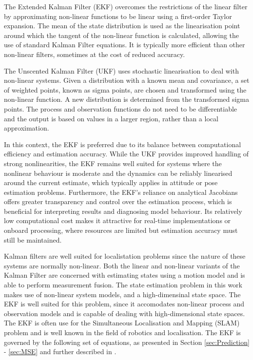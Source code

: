 \noindent
The Extended Kalman Filter (EKF) overcomes the restrictions of the linear filter by approximating non-linear functions to be linear using a first-order Taylor expansion.
The mean of the state distribution is used as the linearisation point around which the tangent of the non-linear function is calculated, allowing the use of standard
Kalman Filter equations. It is typically more efficient than other non-linear filters, sometimes at the cost of reduced accuracy.
\vspace{0.5cm}

\noindent
The Unscented Kalman Filter (UKF) uses stochastic linearisation to deal with non-linear systems. Given a distribution with a known mean and covariance, a set of weighted points,
known as sigma points, are chosen and transformed using the non-linear function. A new distribution is determined from the transformed sigma points. The process and observation
functions do not need to be differentiable and the output is based on values in a larger region, rather than a local approximation.
\vspace{0.5cm}

\noindent
In this context, the EKF is preferred due to its balance between computational efficiency and estimation accuracy. While the UKF provides improved handling of strong nonlinearities, the EKF remains well suited for systems where the nonlinear behaviour is moderate and the dynamics can be reliably linearised around the current estimate, which typically applies in attitude or pose estimation problems. Furthermore, the EKF's reliance on analytical Jacobians offers greater transparency and control over the estimation process, which is beneficial for interpreting results and diagnosing model behaviour. Its relatively low computational cost makes it attractive for real-time implementations or onboard processing, where resources are limited but estimation accuracy must still be maintained.


Kalman filters are well suited for localistation problems since the nature of these systems are normally non-linear. Both the linear and non-linear variants of the Kalman Filter
are concerned with estimating states using a motion model and is able to perform measurement fusion. The state estimation problem in this work makes use of non-linear system 
models, and a high-dimensinal state space. The EKF is well suited for this problem, since it accomodates non-linear process and observation models and is capable 
of dealing with high-dimensional state spaces. The EKF is often use for the Simultaneous Localisation and Mapping (SLAM) problem and is well known in the field of robotics and localisation. The EKF is governed by the following set of equations, as presented in Section \ref{sec:Prediction} - \ref{sec:MSE} and further described in \cite{Alex}.
\vspace{0.5cm}

